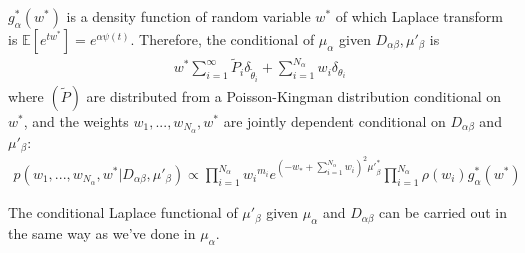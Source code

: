 \documentclass{article}
\begin{document}
$g^*_\alpha(w^*)$ is a density function of random variable $w^*$ of which Laplace transform is $\mathbb{E}[e^{tw^*}] = e^{\alpha\psi(t)}$. Therefore, the conditional of $\mu_\alpha$ given $D_{\alpha\beta}, \mu'_\beta$ is
\begin{align}
w^* \sum_{i=1}^{\infty}\tilde{P}_i\delta_{\tilde\theta_i} + \sum_{i=1}^{N_\alpha} w_i \delta_{\theta_i} 
\end{align}
where $(\tilde{P})$ are distributed from a Poisson-Kingman distribution conditional on $w^*$, and the weights $w_1, ..., w_{N_\alpha}, w^*$ are jointly dependent conditional on $D_{\alpha\beta}$ and $\mu'_\beta$:
\begin{align}
p(w_1, ..., w_{N_\alpha}, w^* | D_{\alpha\beta}, \mu'_\beta) \propto \prod_{i=1}^{N_\alpha}{w_i}^{m_i} e^{(-w_* + \sum_{i=1}^{N_\alpha}w_i)^2 {\mu'}_\beta^*} \prod_{i=1}^{N_\alpha} \rho(w_i) g^*_\alpha(w^*)
\end{align}

The conditional Laplace functional of $\mu'_\beta$ given $\mu_\alpha$ and $D_{\alpha\beta}$ can be carried out in the same way as we've done in $\mu_\alpha$.



\end{document}
